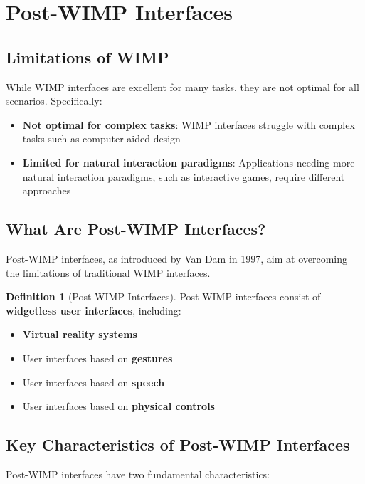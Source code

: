 \documentclass[11pt,a4paper]{article}
\theoremstyle{definition}
\newtheorem{definition}{Definition}[section]
\theoremstyle{plain}
\theoremstyle{remark}
\begin{document}
\section{Post-WIMP Interfaces}

\subsection{Limitations of WIMP}

While WIMP interfaces are excellent for many tasks, they are not optimal for all scenarios. Specifically:

\begin{itemize}
    \item \textbf{Not optimal for complex tasks}: WIMP interfaces struggle with complex tasks such as computer-aided design
    \item \textbf{Limited for natural interaction paradigms}: Applications needing more natural interaction paradigms, such as interactive games, require different approaches
\end{itemize}

\subsection{What Are Post-WIMP Interfaces?}

Post-WIMP interfaces, as introduced by Van Dam in 1997, aim at overcoming the limitations of traditional WIMP interfaces.

\begin{definition}[Post-WIMP Interfaces]
Post-WIMP interfaces consist of \textbf{widgetless user interfaces}, including:
\begin{itemize}
    \item \textbf{Virtual reality systems}
    \item User interfaces based on \textbf{gestures}
    \item User interfaces based on \textbf{speech}
    \item User interfaces based on \textbf{physical controls}
\end{itemize}
\end{definition}

\subsection{Key Characteristics of Post-WIMP Interfaces}

Post-WIMP interfaces have two fundamental characteristics:
\end{document}
